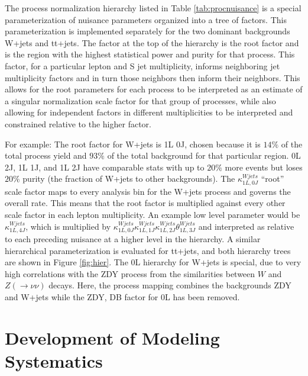 The process normalization hierarchy listed in Table \ref{tab:procnuisance} is a special parameterization of nuisance parameters organized into a tree of factors. This parameterization is implemented separately for the two dominant backgrounds W+jets and tt+jets. The factor at the top of the hierarchy is the root factor and is the region with the highest statistical power and purity for that process. This factor, for a particular lepton and S jet multiplicity, informs neighboring jet multiplicity factors and in turn those neighbors then inform their neighbors. This allows for the root parameters for each process to be interpreted as an estimate of a singular normalization scale factor for that group of processes, while also allowing for independent factors in different multiplicities to be interpreted and constrained relative to the higher factor. 

For example: The root factor for W+jets is 1L 0J, chosen because it is $14\%$ of the total process yield and $93\%$ of the total background for that particular region. 0L 2J, 1L 1J, and 1L 2J have comparable stats with up to $20\%$ more events but loses $20\%$ purity (the fraction of W+jets to other backgrounds). The $\kappa^{Wjets}_{1L, 0J}$ ``root'' scale factor maps to every analysis bin for the W+jets process and governs the overall rate. This means that the root factor is multiplied against every other scale factor in each lepton multiplicity. An example low level parameter would be $\kappa^{Wjets}_{1L, 4J}$, which is multiplied by $\kappa^{Wjets}_{1L, 0J}\kappa^{Wjets}_{1L, 1J}\kappa^{Wjets}_{1L ,2J}\theta^{Wjets}_{1L, 3J}$ and interpreted as relative to each preceding nuisance at a higher level in the hierarchy.  A similar hierarchical parameterization is evaluated for tt+jets, and both hierarchy trees are shown in Figure \ref{fig:hier}. The 0L hierarchy for W+jets is special, due to very high correlations with the ZDY process from the similarities between $W$ and $Z(\rightarrow\nu\nu)$ decays. Here, the process mapping combines the backgrounds ZDY and W+jets while the ZDY, DB factor for 0L has been removed. 

\section{Development of Modeling Systematics}


